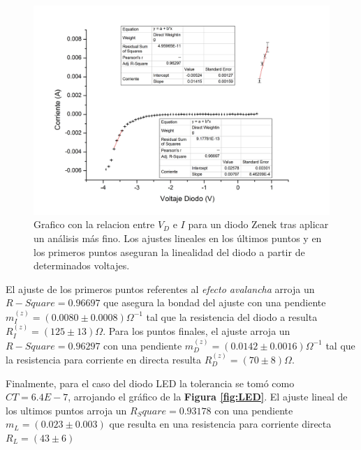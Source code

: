 \documentclass[11pt,a4paper]{article}
\begin{document}
\begin{figure}[H]
\centering
\includegraphics[scale=0.36]{zenek}
   \caption{Grafico con la relacion entre $V_D$ e $I$ para un diodo Zenek tras aplicar un análisis más fino. Los ajustes lineales en los últimos puntos y en los primeros puntos aseguran la linealidad del diodo a partir de determinados voltajes.}
   \label{fig:zenek}
\end{figure}

El ajuste de los primeros puntos referentes al \textit{efecto avalancha} arroja un $R-Square = 0.96697$ que asegura la bondad del ajuste con una pendiente $m_I^{(z)} = (0.0080 \pm 0.0008)\Omega^{-1}$ tal que la resistencia del diodo a resulta $R_I^{(z)} = (125 \pm 13)\Omega$. Para los puntos finales, el ajuste arroja un $R-Square = 0.96297$ con una pendiente $m_D^{(z)} = (0.0142 \pm 0.0016)\Omega^{-1}$ tal que la resistencia para corriente en directa resulta $R_D^{(z)} = (70 \pm 8)\Omega$.

Finalmente, para el caso del diodo LED la tolerancia se tomó como $CT = 6.4E-7$, arrojando el gráfico de la \textbf{Figura \ref{fig:LED}}. El ajuste lineal de los ultimos puntos arroja un $R_Square = 0.93178$ con una pendiente $m_L = (0.023 \pm 0.003)$ que resulta en una resistencia para corriente directa $R_L = (43 \pm 6)$
\end{document}
